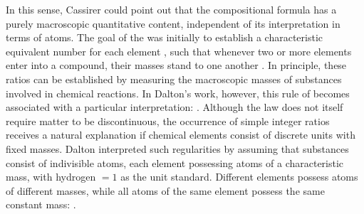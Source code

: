 \documentclass[submitted,12pt]{article}
\begin{document}
In this sense, Cassirer could point out that the compositional formula has a purely macroscopic quantitative content, independent of its interpretation in terms of atoms. The goal of the   was initially to establish a characteristic equivalent number for each element , such that whenever two or more elements enter into a compound, their masses stand to one another  . In principle, these ratios can be established by measuring the macroscopic masses of substances involved in chemical reactions. In Dalton's work, however, this rule of  becomes associated with a particular interpretation:  . Although the law does not itself require matter to be discontinuous, the occurrence of simple integer ratios receives a natural explanation if chemical elements consist of discrete units with fixed masses. Dalton interpreted such regularities by assuming that substances consist of indivisible atoms, each element possessing atoms of a characteristic mass, with hydrogen $= 1$ as the unit standard. Different elements possess atoms of different masses, while all atoms of the same element possess the same constant mass:  .
\end{document}
